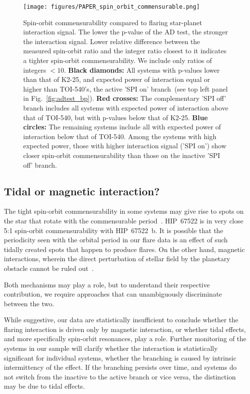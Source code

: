 \documentclass[twocolumn]{aastex631}
\begin{document}
\begin{figure}[t]
    \begin{centering}
        \texttt{[image: figures/PAPER\_spin\_orbit\_commensurable.png]}
        \caption{
           Spin-orbit commensurability compared to flaring star-planet interaction signal. The lower the p-value of the AD test, the stronger the interaction signal. Lower relative difference between the measured spin-orbit ratio and the integer ratio closest to it indicates a tighter spin-orbit commensurability. We include only ratios of integers $<10$. \textbf{Black diamonds:} All systems with p-values lower than that of K2-25, and expected power of interaction equal or higher than TOI-540's, the active 'SPI on' branch~(see top left panel in Fig.~\ref{fig:adtest_bp}). \textbf{Red crosses:} The complementary 'SPI off' branch includes all systems with expected power of interaction above that of TOI-540, but with p-values below that of K2-25. \textbf{Blue circles:} The remaining systems include all with expected power of interaction below that of TOI-540. Among the systems with high expected power, those with higher interaction signal ('SPI on') show closer spin-orbit commensurability than those on the inactive 'SPI off' branch.
        }
        \label{fig:spinorbit}
    \end{centering}
\end{figure}

\subsection{Tidal or magnetic interaction?}
\label{sec:discussion:tidalmagnetic}
The tight spin-orbit commensurability in some systems may give rise to spots on the star that rotate with the commensurable period~\citep{lanza2022model}. HIP~67522 is in very close 5:1 spin-orbit commensurability with HIP~67522~b. It is possible that the periodicity seen with the orbital period in our flare data is an effect of such tidally created spots that happen to produce flares. On the other hand, magnetic interactions, wherein the direct perturbation of stellar field by the planetary obstacle cannot be ruled out~\citep{lanza2018closeby, saur2013magnetic}.

Both mechanisms may play a role, but to understand their respective contribution, we require approaches that can unambiguously discriminate between the two.


While suggestive, our data are statistically insufficient to conclude whether the flaring interaction is driven only by magnetic interaction, or whether tidal effects, and more specifically spin-orbit resonances, play a role. Further monitoring of the systems in our sample will clarify whether the interaction is statistically significant for individual systems, whether the branching is caused by intrinsic intermittency of the effect. If the branching persists over time, and systems do not switch from the inactive to the active branch or vice versa, the distinction may be due to tidal effects.
\end{document}
